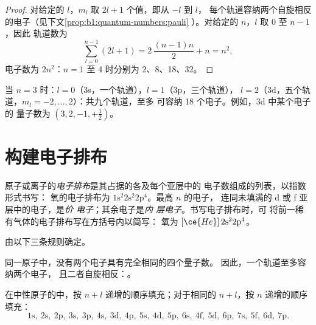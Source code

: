 \begin{proof}
对给定的 $l$，$m_l$ 取 $2l + 1$ 个值，即从 $-l$ 到 $l$，
每个轨道容纳两个自旋相反的电子（见下文\cref{prop:b1:quantum-numbers:pauli}
）。对给定的 $n$，$l$ 取 $0$ 至 $n - 1$，因此
轨道数为
\[
  \sum_{l=0}^{n-1} (2l+1) = 2\,\frac{(n-1)n}{2} + n = n^2 ,
\]
电子数为 $2n^2$：$n = 1$ 至 4 时分别为 2、8、18、32。
\end{proof}

\begin{example}[第三电子层]\label{ex:b1:quantum-numbers:third}
当 $n = 3$ 时：$l = 0$（3s，一个轨道），$l = 1$（3p，三个轨道），
$l = 2$（3d，五个轨道，$m_l = -2, \dots, 2$）：共九个轨道，至多
可容纳 18 个电子。例如，3d 中某个电子的
量子数为 $(3, 2, -1, +\tfrac12)$。
\end{example}

\section{构建电子排布}

\begin{definition}[电子排布]\label{def:b1:quantum-numbers:configuration}
原子或离子的\emph{电子排布}是其占据的各及每个亚层中的
电子数组成的列表，以指数形式书写：
氧的电子排布为 $1\text{s}^2 2\text{s}^2
2\text{p}^4$。最高 $n$ 的电子，
连同未填满的 d 或 f 亚层中的电子，是\emph{价
电子}；其余电子是\emph{内
层电子}。书写电子排布时，可
将前一稀有气体的电子排布写在方括号内以简写：
氧为 $[\ce{He}]\,2\text{s}^2 2\text{p}^4$。
\end{definition}

由以下三条规则确定。

\begin{proposition}[泡利不相容原理]\label{prop:b1:quantum-numbers:pauli}
同一原子中，没有两个电子具有完全相同的四个量子数。
因此，一个轨道至多容纳两个电子，
且二者自旋相反：。
\end{proposition}
\admitted

\begin{proposition}[克氏规则]\label{prop:b1:quantum-numbers:klechkowski}
在中性原子的中，按
$n + l$ 递增的顺序填充；对于相同的 $n + l$，按
$n$ 递增的顺序填充：
\[
  1\text{s},\ 2\text{s},\ 2\text{p},\ 3\text{s},\ 3\text{p},\ 4\text{s},\
  3\text{d},\ 4\text{p},\ 5\text{s},\ 4\text{d},\ 5\text{p},\ 6\text{s},\
  4\text{f},\ 5\text{d},\ 6\text{p},\ 7\text{s},\ 5\text{f},\ 6\text{d},\
  7\text{p}.
\]
\end{proposition}
\admitted

